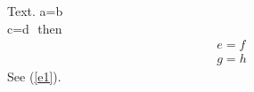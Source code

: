 \documentclass{article}
\makeatletter
\renewenvironment{gather}{\linenomathNonumbers\start@gather\st@rredfalse}{%
  \math@cr \black@\totwidth@ \egroup
  $$\endlinenomath\ignorespacesafterend}
\renewenvironment{gather*}{\linenomath\start@gather\st@rredtrue}{\endgather\endlinenomath}
\makeatother
\begin{document}
Text. \begin{gather} a=b \label{e1}\\ c=d \notag \end{gather} then \begin{gather*} e=f \\ g=h \end{gather*} See (\ref{e1}).
\end{document}
